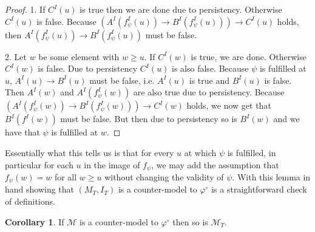 \documentclass[a4paper,11pt]{report}
\theoremstyle{definition}
\theoremstyle{definition}
\newtheorem{corollary}[theorem]{Corollary}
\theoremstyle{definition}
\theoremstyle{definition}
\theoremstyle{definition}
\theoremstyle{definition}
\theoremstyle{definition}
\begin{document}
	\begin{proof}
		1. If $C^I(u)$ is true then we are done due to persistency. Otherwise $C^I(u)$ is false.
		Because $(A^I(f_\psi^I(u))\to B^I(f_\psi^I(u)))\to C^I(u)$ holds, then $A^I(f_\psi^I(u))\to B^I(f_\psi^I(u))$ must be false.
		
		
		2. Let $w$ be some element with $w\geq u$.
		If $C^I(w)$ is true, we are done.
		Otherwise $C^I(w)$ is false.
		Due to persistency $C^I(u)$ is also false.
		Because $\psi$ is fulfilled at $u$, $A^I(u)\to B^I(u)$ must be false, i.e. $A^I(u)$ is true and $B^I(u)$ is false. Then $A^I(w)$ and $A^I(f^I_\psi(w))$ are also true due to persistency.
		Because $(A^I(f^I_\psi(w))\to B^I(f^I_\psi(w)))\to C^I(w)$ holds, we now get that  $B^I(f^I(w))$ must be false.
		But then due to persistency so is $B^I(w)$ and we have that $\psi$ is fulfilled at $w$.
	\end{proof}

	Essentially what this tells us is that for every $u$ at which $\psi$ is fulfilled, in particular for each $u$ in the image of $f_\psi$, we may add the assumption that $f_\psi(w) = w$ for all $w\geq u$ without changing the validity of $\psi$.
	With this lemma in hand showing that $(M_T, I_T)$ is a counter-model to $\varphi^\circ$ is a straightforward check of definitions.
	
	\begin{corollary}
		If $\mathcal M$ is a counter-model to $\varphi^\circ$ then so is $\mathcal M_T$.
	\end{corollary}
	
\end{document}
